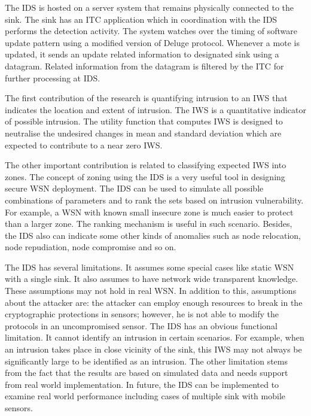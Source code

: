 \documentclass[conference]{IEEEtran}
\begin{document}
The IDS is hosted on a server system that remains physically connected to the  sink. 
The sink has an ITC application which in coordination with the IDS performs the detection activity.
The system watches over the timing of software update pattern using a modified version of Deluge protocol.
Whenever a mote is updated, it sends an update related information to designated sink using a datagram.  
Related information from the datagram is filtered by the ITC for further processing at IDS.

The first contribution of the research is quantifying intrusion to an IWS that indicates the location and extent of intrusion.
The IWS is a quantitative indicator of possible intrusion.
The utility function that computes IWS is designed to neutralise the undesired %
changes in mean and standard deviation which are expected to contribute to a near zero IWS.

The other important contribution is related to classifying expected IWS into zones.
The concept of zoning using the IDS is a very useful tool in designing secure WSN deployment.
The IDS can be used to simulate all possible combinations of parameters and  to rank the sets based on intrusion vulnerability.
For example, a WSN with known small insecure zone is much easier to protect than a larger zone.
The ranking mechanism is useful in such scenario.
Besides, the IDS also can indicate some other kinds of anomalies such as node relocation, node repudiation, node compromise and so on.

The IDS has several limitations. 
It assumes some special cases like static WSN with a single sink.
It also assumes to have network wide transparent knowledge.
These assumptions may not hold in real WSN.
In addition to this, assumptions about the attacker are: the attacker can employ enough resources to break in the cryptographic protections in sensors; however, he is not able to modify the protocols in an uncompromised sensor.
The IDS has an obvious functional limitation.
It cannot identify an intrusion in certain scenarios.
For example, when an intrusion takes place in close vicinity of the sink, this IWS may not always be significantly large to be identified as an intrusion.
The other limitation stems from the fact that the results are based on simulated data and needs support from real world implementation.
In future,  the IDS can be implemented to examine real world performance including cases of multiple sink with mobile sensors.






\IEEEtriggercmd{\enlargethispage{-5in}}






\end{document}

